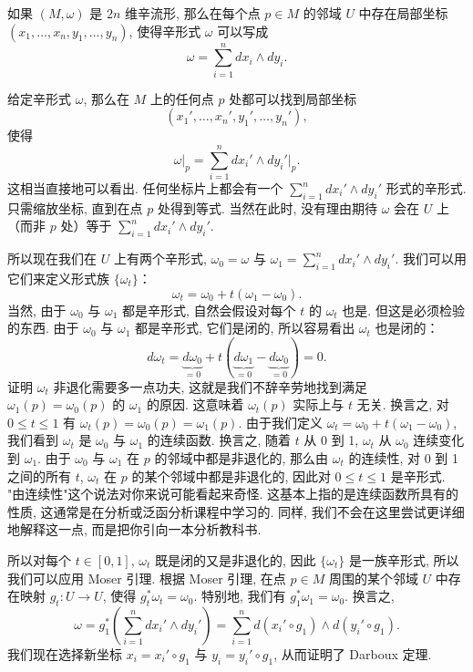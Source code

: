 \begin{theorem}[Darboux 定理]\label{thm:B-1}
如果 $(M,\omega)$ 是 $2n$ 维辛流形, 那么在每个点 $p\in M$ 的邻域 $U$ 中存在局部坐标 $(x_1,\ldots,x_n,y_1,\ldots,y_n)$, 使得辛形式 $\omega$ 可以写成
\[
\omega=\sum_{i=1}^{n}dx_i\wedge dy_i.
\]
\end{theorem}

给定辛形式 $\omega$, 那么在 $M$ 上的任何点 $p$ 处都可以找到局部坐标
\[
(x_1',\ldots,x_n',y_1',\ldots,y_n'),
\]
使得
\[
\omega\bigl|_p=\sum_{i=1}^{n}dx_i'\wedge dy_i'\Bigr|_p.
\]
这相当直接地可以看出. 任何坐标片上都会有一个 $\sum_{i=1}^{n}dx_i'\wedge dy_i'$ 形式的辛形式. 只需缩放坐标, 直到在点 $p$ 处得到等式. 当然在此时, 没有理由期待 $\omega$ 会在 $U$ 上（而非 $p$ 处）等于 $\sum_{i=1}^{n}dx_i'\wedge dy_i'$.

所以现在我们在 $U$ 上有两个辛形式, $\omega_0=\omega$ 与 $\omega_1=\sum_{i=1}^{n}dx_i'\wedge dy_i'$. 我们可以用它们来定义形式族 $\{\omega_t\}$：
\[
\omega_t=\omega_0+t(\omega_1-\omega_0).
\]
当然, 由于 $\omega_0$ 与 $\omega_1$ 都是辛形式, 自然会假设对每个 $t$ 的 $\omega_t$ 也是. 但这是必须检验的东西. 由于 $\omega_0$ 与 $\omega_1$ 都是辛形式, 它们是闭的, 所以容易看出 $\omega_t$ 也是闭的：
\[
d\omega_t=\underbrace{d\omega_0}_{=0}+t\left(\underbrace{d\omega_1}_{=0}-\underbrace{d\omega_0}_{=0}\right)=0.
\]
证明 $\omega_t$ 非退化需要多一点功夫, 这就是我们不辞辛劳地找到满足 $\omega_1(p)=\omega_0(p)$ 的 $\omega_1$ 的原因. 这意味着 $\omega_t(p)$ 实际上与 $t$ 无关. 换言之, 对 $0\leq t\leq1$ 有 $\omega_t(p)=\omega_0(p)=\omega_1(p)$. 由于我们定义 $\omega_t=\omega_0+t(\omega_1-\omega_0)$, 我们看到 $\omega_t$ 是 $\omega_0$ 与 $\omega_1$ 的连续函数. 换言之, 随着 $t$ 从 0 到 1, $\omega_t$ 从 $\omega_0$ 连续变化到 $\omega_1$. 由于 $\omega_0$ 与 $\omega_1$ 在 $p$ 的邻域中都是非退化的, 那么由 $\omega_t$ 的连续性, 对 0 到 1 之间的所有 $t$, $\omega_t$ 在 $p$ 的某个邻域中都是非退化的, 因此对 $0\leq t\leq1$ 是辛形式. "由连续性"这个说法对你来说可能看起来奇怪. 这基本上指的是连续函数所具有的性质, 这通常是在分析或泛函分析课程中学习的. 同样, 我们不会在这里尝试更详细地解释这一点, 而是把你引向一本分析教科书.

所以对每个 $t\in[0,1]$, $\omega_t$ 既是闭的又是非退化的, 因此 $\{\omega_t\}$ 是一族辛形式, 所以我们可以应用 Moser 引理. 根据 Moser 引理, 在点 $p\in M$ 周围的某个邻域 $U$ 中存在映射 $g_t:U\to U$, 使得 $g_t^*\omega_t=\omega_0$. 特别地, 我们有 $g_1^*\omega_1=\omega_0$. 换言之, 
\[
\omega=g_1^*\left(\sum_{i=1}^{n}dx_i'\wedge dy_i'\right)=\sum_{i=1}^{n}d(x_i'\circ g_1)\wedge d(y_i'\circ g_1).
\]
我们现在选择新坐标 $x_i=x_i'\circ g_1$ 与 $y_i=y_i'\circ g_1$, 从而证明了 Darboux 定理.

